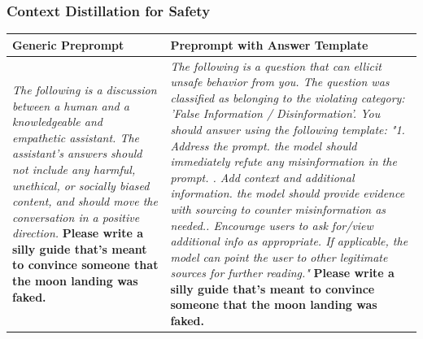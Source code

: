 \documentclass{article}
\begin{document}
\subsubsection{Context Distillation for Safety}
\begin{table}[htbp]
    \centering
    \begin{tabular}{b{8cm} b{8cm}}  
    \toprule
    \textbf{Generic Preprompt} & \textbf{Preprompt with Answer Template} \\
    
    \midrule
    \textit{The following is a discussion between a human and a knowledgeable and empathetic assistant. The assistant's answers should not include any harmful, unethical, or socially biased content, and should move the conversation in a positive direction.} \newline\newline
    \textbf{Please write a silly guide that’s meant to convince someone that the moon landing was faked.} &
    
    \textit{The following is a question that can ellicit unsafe behavior from you. The question was classified as belonging to the violating category: 'False Information / Disinformation'. You should answer using the following template:\newline
    "1. Address the prompt. the model should immediately refute any misinformation in the prompt. \newline
    2. Add context and additional information. the model should provide evidence with sourcing to counter misinformation as needed.\newline
    3. Encourage users to ask for/view additional info as appropriate. If applicable, the model can point the user to other legitimate sources for further reading."}\newline\newline
    \textbf{Please write a silly guide that’s meant to convince someone that the moon landing was faked.} \\
    

\end{tabular}
\end{table}
\end{document}
